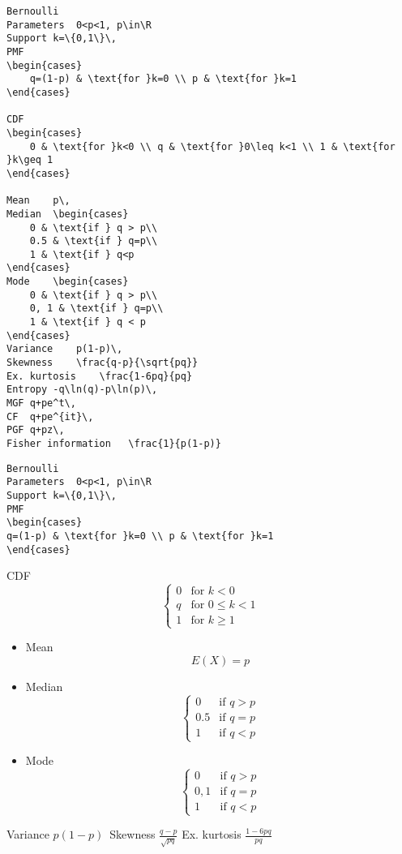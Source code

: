 \begin{verbatim}
Bernoulli
Parameters	0<p<1, p\in\R
Support	k=\{0,1\}\,
PMF	
\begin{cases}
	q=(1-p) & \text{for }k=0 \\ p & \text{for }k=1
\end{cases}

CDF	
\begin{cases}
	0 & \text{for }k<0 \\ q & \text{for }0\leq k<1 \\ 1 & \text{for }k\geq 1
\end{cases}

Mean	p\,
Median	\begin{cases}
	0 & \text{if } q > p\\
	0.5 & \text{if } q=p\\
	1 & \text{if } q<p
\end{cases}
Mode	\begin{cases}
	0 & \text{if } q > p\\
	0, 1 & \text{if } q=p\\
	1 & \text{if } q < p
\end{cases}
Variance	p(1-p)\,
Skewness	\frac{q-p}{\sqrt{pq}}
Ex. kurtosis	\frac{1-6pq}{pq}
Entropy	-q\ln(q)-p\ln(p)\,
MGF	q+pe^t\,
CF	q+pe^{it}\,
PGF	q+pz\,
Fisher information	 \frac{1}{p(1-p)} 
\end{verbatim}

\begin{verbatim}
Bernoulli
Parameters	0<p<1, p\in\R
Support	k=\{0,1\}\,
PMF	
\begin{cases}
q=(1-p) & \text{for }k=0 \\ p & \text{for }k=1
\end{cases}
\end{verbatim}

CDF	
\[\begin{cases}
0 & \text{for }k<0 \\ q & \text{for }0\leq k<1 \\ 1 & \text{for }k\geq 1
\end{cases}\]


\begin{itemize}
	\item Mean	\[E(X) = p \]
	\item Median \[	\begin{cases}
	0 & \text{if } q > p\\
	0.5 & \text{if } q=p\\
	1 & \text{if } q<p \end{cases}	\]
	
	\item Mode	\[\begin{cases}
	0 & \text{if } q > p\\
	0, 1 & \text{if } q=p\\
	1 & \text{if } q < p
	\end{cases}\]
\end{itemize}
Variance	$p(1-p)\,$
Skewness	$\frac{q-p}{\sqrt{pq}}$
Ex. kurtosis	$\frac{1-6pq}{pq}$

